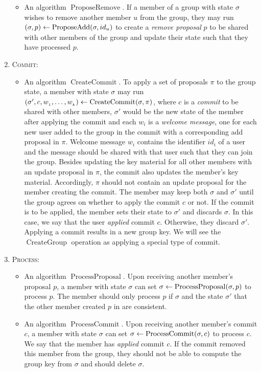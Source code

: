 \begin{definition}[CGKA]
\begin{enumerate}[1.]
\begin{itemize}
				\item An algorithm $\operatorname{ProposeRemove}$. If a member of a group with state $\sigma$ wishes to remove another member $u$ from the group, they may run $(\sigma, p) \leftarrow \operatorname{ProposeAdd}(\sigma, id_u)$ to create a \emph{remove proposal} $p$ to be shared with other members of the group and update their state such that they have processed $p$.
			\end{itemize}
		\item[] \textsc{Commit:}
			\begin{itemize}
				\item An algorithm $\operatorname{CreateCommit}$. To apply a set of proposals $\pi$ to the group state, a member with state $\sigma$ may run $(\sigma', c, w_{_1}, \ldots, w_{_k}) \leftarrow \operatorname{CreateCommit}(\sigma, \pi)$, where $c$ is a \emph{commit} to be shared with other members, $\sigma'$ would be the new state of the member after applying the commit and each $w_{i}$ is a \emph{welcome message}, one for each new user added to the group in the commit with a corresponding add proposal in $\pi$. Welcome message $w_i$ contains the identifier $id_i$ of a user and the message should be shared with that user such that they can join the group. Besides updating the key material for all other members with an update proposal in $\pi$, the commit also updates the member's key material. Accordingly, $\pi$ should not contain an update proposal for the member creating the commit. The member may keep both $\sigma$ and $\sigma'$ until the group agrees on whether to apply the commit $c$ or not. If the commit is to be applied, the member sets their state to $\sigma'$ and discards $\sigma$. In this case, we say that the user \emph{applied} commit $c$. Otherwise, they discard $\sigma'$. Applying a commit results in a new group key. We will see the $\operatorname{CreateGroup}$ operation as applying a special type of commit.
			\end{itemize}
		\item[] \textsc{Process:}
			\begin{itemize}
				\item An algorithm $\operatorname{ProcessProposal}$. Upon receiving another member's proposal $p$, a member with state $\sigma$ can set $\sigma \leftarrow \operatorname{ProcessProposal}(\sigma, p)$ to process $p$.
				      The member should only process $p$ if $\sigma$ and the state $\sigma'$ that the other member created $p$ in are consistent.
				\item An algorithm $\operatorname{ProcessCommit}$. Upon receiving another member's commit $c$, a member with state $\sigma$ can set $\sigma \leftarrow \operatorname{ProcessCommit}(\sigma, c)$ to process $c$. We say that the member has \emph{applied} commit $c$. If the commit removed this member from the group, they should not be able to compute the group key from $\sigma$ and should delete $\sigma$.

\end{itemize}
\end{enumerate}
\end{definition}

